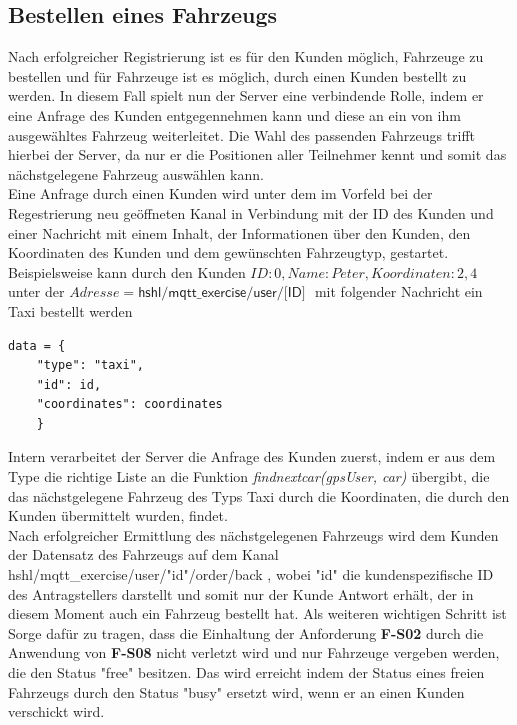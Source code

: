 \subsection{Bestellen eines Fahrzeugs}
Nach erfolgreicher Registrierung ist es für den Kunden möglich, Fahrzeuge zu bestellen und für Fahrzeuge ist es möglich, durch einen Kunden bestellt zu werden. In diesem Fall spielt nun der Server eine verbindende Rolle, indem er eine Anfrage des Kunden entgegennehmen kann und diese an ein von ihm ausgewähltes Fahrzeug weiterleitet. Die Wahl des passenden Fahrzeugs trifft hierbei der Server, da nur er die Positionen aller Teilnehmer kennt und somit das nächstgelegene Fahrzeug auswählen kann.\\
Eine Anfrage durch einen Kunden wird unter dem im Vorfeld bei der Regestrierung neu geöffneten Kanal in Verbindung mit der ID des Kunden und einer Nachricht mit einem Inhalt, der Informationen über den Kunden, den Koordinaten des Kunden und dem gewünschten Fahrzeugtyp, gestartet. Beispielsweise kann durch den Kunden $ID: 0, Name: Peter, Koordinaten: 2,4$ unter der $Adresse=\textsf{hshl/mqtt\_exercise/user/[ID] }$ mit folgender Nachricht ein Taxi bestellt werden \begin{lstlisting}
data = {
	"type": "taxi",
    "id": id,
    "coordinates": coordinates
    }
\end{lstlisting}
Intern verarbeitet der Server die Anfrage des Kunden zuerst, indem er aus dem Type die richtige Liste an die Funktion \textit{findnextcar(gpsUser, car)} übergibt, die das nächstgelegene Fahrzeug des Typs Taxi durch die Koordinaten, die durch den Kunden übermittelt wurden, findet.\\
Nach erfolgreicher Ermittlung des nächstgelegenen Fahrzeugs wird dem Kunden der Datensatz des Fahrzeugs auf dem Kanal \textsf{hshl/mqtt\_exercise/user/"id"/order/back} , wobei "id"  die kundenspezifische ID des Antragstellers darstellt und somit nur der Kunde Antwort erhält, der in diesem Moment auch ein Fahrzeug bestellt hat. Als weiteren wichtigen Schritt ist Sorge dafür zu tragen, dass die Einhaltung der Anforderung \textbf{F-S02} durch die Anwendung von \textbf{F-S08} nicht verletzt wird und nur Fahrzeuge vergeben werden, die den Status "free" besitzen. Das wird erreicht indem der Status eines freien Fahrzeugs durch den Status "busy" ersetzt wird, wenn er an einen Kunden verschickt wird.
